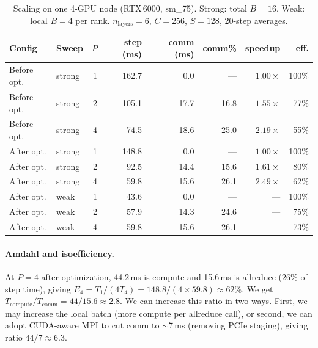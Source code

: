\documentclass[11pt,letterpaper]{article}
\begin{document}
\begin{table}[h]
  \centering\small\setlength{\tabcolsep}{5pt}
  \begin{tabular}{@{}llrrrrrr@{}}
    \toprule
    \textbf{Config} & \textbf{Sweep} & $P$ &
    \textbf{step (ms)} & \textbf{comm (ms)} & \textbf{comm\%} &
    \textbf{speedup} & \textbf{eff.} \\
    \midrule
    Before opt. & strong & 1 & 162.7 & 0.0  & ---   & $1.00\times$ & 100\% \\
    Before opt. & strong & 2 & 105.1 & 17.7 & 16.8  & $1.55\times$ & 77\%  \\
    Before opt. & strong & 4 &  74.5 & 18.6 & 25.0  & $2.19\times$ & 55\%  \\
    \midrule
    After opt.  & strong & 1 & 148.8 & 0.0  & ---   & $1.00\times$ & 100\% \\
    After opt.  & strong & 2 &  92.5 & 14.4 & 15.6  & $1.61\times$ & 80\%  \\
    After opt.  & strong & 4 &  59.8 & 15.6 & 26.1  & $2.49\times$ & 62\%  \\
    \midrule
    After opt.  & weak   & 1 &  43.6 & 0.0  & ---   & ---          & 100\% \\
    After opt.  & weak   & 2 &  57.9 & 14.3 & 24.6  & ---          & 75\%  \\
    After opt.  & weak   & 4 &  59.8 & 15.6 & 26.1  & ---          & 73\%  \\
    \bottomrule
  \end{tabular}
  \caption{Scaling on one 4-GPU node (RTX\,6000, sm\_75). Strong: total
    $B{=}16$. Weak: local $B{=}4$ per rank. $n_\text{layers}{=}6$,
    $C{=}256$, $S{=}128$, 20-step averages.}
  \label{tab:scaling}
\end{table}



\paragraph{Amdahl and isoefficiency.}
At $P{=}4$ after optimization, 44.2\,ms is compute and 15.6\,ms is allreduce
(26\% of step time), giving $E_4 = T_1/(4T_4) = 148.8/(4\times59.8) \approx 62\%$.
We get $T_\text{compute}/T_\text{comm} = 44/15.6 \approx 2.8$.
We can increase this ratio in two ways. First, we may increase the local batch (more compute per
allreduce call), or second, we can adopt CUDA-aware MPI to cut comm to $\sim$7\,ms
(removing PCIe staging), giving ratio $44/7 \approx 6.3$.
\end{document}
